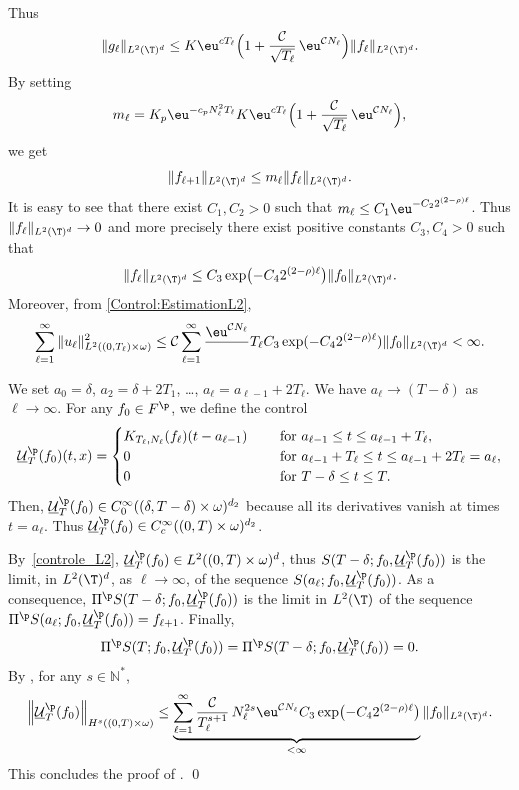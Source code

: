 Thus
\[
\|g_\ell\|_{L^2(\T)^d} \leq K \eu^{cT_\ell} \Bigl(1 + \frac{\mathcal{C}}{\sqrt{T_\ell}}\, \eu^{\mathcal{C} N_\ell}\Bigr)
\|f_\ell\|_{L^2(\T)^d}.
\]
By setting
\[
m_\ell = K_p \eu^{- c_p N_\ell^2 T_\ell} K \eu^{cT_\ell} \Bigl(1 + \frac{\mathcal{C}}{\sqrt{T_\ell}}\, \eu^{\mathcal{C} N_\ell}\Bigr),
\]
we get
\[
\|f_{\ell+1}\|_{L^2(\T)^d} \leq m_\ell \|f_\ell \|_{L^2(\T)^d}.
\]
It is easy to see that there exist $C_1, C_2>0$ such that $m_\ell \leq C_1 \eu^{-C_2 2^{(2-\rho)\ell}}$. Thus $\|f_\ell\|_{L^2(\T)^d} \to 0$ and more precisely there exist positive constants $C_3, C_4>0$ such that
\[
\|f_\ell\|_{L^2(\T)^d} \leq C_3 \exp \bigl(-C_4 2^{(2-\rho)\ell} \bigr) \|f_0\|_{L^2(\T)^d}.
\]
Moreover, from \eqref{Control:EstimationL2},
\begin{equation}\label{controle_L2}
\sum_{\ell=1}^\infty \| u_\ell \|_{L^2((0,T_\ell)\times\omega)}^2 \leq
\mathcal{C} \sum_{\ell=1}^\infty \frac{\eu^{\mathcal{C}N_\ell}}\,{T_\ell} C_3 \exp(-C_4 2^{(2-\rho)\ell}) \|f_0\|_{L^2(\T)^d} <\infty.
\end{equation}

We set $a_0=\delta$, $a_2=\delta+2T_1$, \ldots, $a_\ell=a_{\ell-1}+2T_\ell$. We have $a_\ell \to (T-\delta)$ as $\ell \to \infty$. For any $f_0 \in F^\p$, we define the control
\[
\underline{\mathcal{U}}_T^{\p}(f_0)(t,x)=\begin{cases}
K_{T_\ell,N_\ell}(f_\ell)(t-a_{\ell-1})\quad & \text{ for } a_{\ell-1}\leq t \leq a_{\ell-1}+T_\ell, \\
0 & \text{ for } a_{\ell-1}+T_\ell\leq t \leq a_{\ell-1}+2T_\ell=a_{\ell},
\\
0 & \text{ for } T-\delta \leq t \leq T.
\end{cases}
\]
Then, $\underline{\mathcal{U}}_T^{\p}(f_0) \in C^\infty_0((\delta,T-\delta)\times \omega)^{d_2}$ because all its derivatives vanish at times $t=a_\ell$. Thus $\underline{\mathcal{U}}_T^{\p}(f_0) \in C^\infty_c((0,T)\times\omega)^{d_2}$.

By~\eqref{controle_L2}, $\underline{\mathcal{U}}_T^{\p}(f_0) \in L^2((0,T)\times\omega)^d$, thus
$S(T-\delta;f_0,\underline{\mathcal{U}}_T^{\p}(f_0))$ is the limit, in $L^2(\T)^d$, as $\ell \to \infty$, of the sequence $S(a_\ell;f_0,\underline{\mathcal{U}}_T^{\p}(f_0))$. As a consequence,
\hbox{$\Pi^\p S(T-\delta;f_0,\underline{\mathcal{U}}_T^{\p}(f_0))$} is the limit in $L^2(\T)$ of the sequence $\Pi^\p S(a_\ell;f_0,\underline{\mathcal{U}}_T^{\p}(f_0))=f_{\ell+1}$.
Finally,
\[
\Pi^\p S(T;f_0,\underline{\mathcal{U}}_T^{\p}(f_0))=\Pi^\p S(T-\delta;f_0,\underline{\mathcal{U}}_T^{\p}(f_0))=0.
\]
By , for any $s\in\mathbb{N}^*$,
\[
\left\| \underline{\mathcal{U}}_T^{\p}(f_0) \right\|_{H^s((0,T)\times\omega)}
\leq \underbrace{\sum_{\ell=1}^\infty \frac{\mathcal{C}}{T_\ell^{s+1}}\, N_\ell^{2s} \eu^{\mathcal{C} N_\ell} C_3 \exp \bigl(-C_4 2^{(2-\rho)\ell} \bigr)}_{< \infty}
\|f_0\|_{L^2(\T)^d}.
\]
This concludes the proof of . \qed

